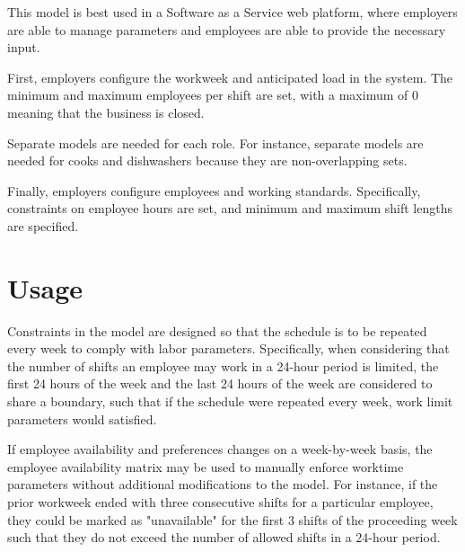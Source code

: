 This model is best used in a Software as a Service web platform, where employers are able to manage parameters and employees are able to provide the necessary input. 

First, employers configure the workweek and anticipated load in the system. The minimum and maximum employees per shift are set, with a maximum of 0 meaning that the business is closed. 

Separate models are needed for each role. For instance, separate models are needed for cooks and dishwashers because they are non-overlapping sets.

Finally, employers configure employees and working standards. Specifically, constraints on employee hours are set, and minimum and maximum shift lengths are specified. 

\section{Usage}

Constraints in the model are designed so that the schedule is to be repeated every week to comply with labor parameters. Specifically, when considering that the number of shifts an employee may work in a 24-hour period is limited, the first 24 hours of the week and the last 24 hours of the week are considered to share a boundary, such that if the schedule were repeated every week, work limit parameters would satisfied. 

If employee availability and preferences changes on a week-by-week basis, the employee availability matrix may be used to manually enforce worktime parameters without additional modifications to the model. For instance, if the prior workweek ended with three consecutive shifts for a particular employee, they could be marked as "unavailable" for the first 3 shifts of the proceeding week such that they do not exceed the number of allowed shifts in a 24-hour period.  






